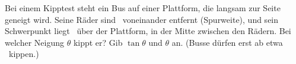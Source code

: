 Bei einem Kipptest steht ein Bus auf einer Plattform, die langsam zur Seite geneigt wird. Seine Räder sind \wSO\ voneinander entfernt (Spurweite), und sein Schwerpunkt liegt \hSO\ über der Plattform, in der Mitte zwischen den Rädern. Bei welcher Neigung $\theta$ kippt er? Gib $\tan\theta$ und $\theta$ an. (Busse dürfen erst ab etwa \wminO\ kippen.)
